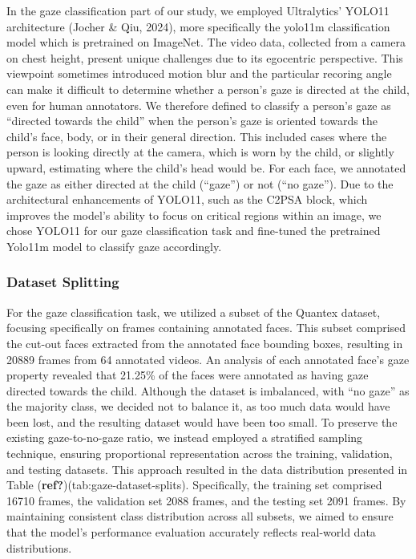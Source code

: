 \documentclass[
  man,floatsintext]{apa6}
\begin{document}
In the gaze classification part of our study, we employed Ultralytics' YOLO11 architecture (Jocher \& Qiu, 2024), more specifically the yolo11m classification model which is pretrained on ImageNet. The video data, collected from a camera on chest height, present unique challenges due to its egocentric perspective. This viewpoint sometimes introduced motion blur and the particular recoring angle can make it difficult to determine whether a person's gaze is directed at the child, even for human annotators. We therefore defined to classify a person's gaze as ``directed towards the child'' when the person's gaze is oriented towards the child's face, body, or in their general direction. This included cases where the person is looking directly at the camera, which is worn by the child, or slightly upward, estimating where the child's head would be. For each face, we annotated the gaze as either directed at the child (``gaze'') or not (``no gaze''). Due to the architectural enhancements of YOLO11, such as the C2PSA block, which improves the model's ability to focus on critical regions within an image, we chose YOLO11 for our gaze classification task and fine-tuned the pretrained Yolo11m model to classify gaze accordingly.

\subsubsection{Dataset Splitting}\label{dataset-splitting-1}

For the gaze classification task, we utilized a subset of the Quantex dataset, focusing specifically on frames containing annotated faces. This subset comprised the cut-out faces extracted from the annotated face bounding boxes, resulting in 20889 frames from 64 annotated videos. An analysis of each annotated face's gaze property revealed that 21.25\% of the faces were annotated as having gaze directed towards the child. Although the dataset is imbalanced, with ``no gaze'' as the majority class, we decided not to balance it, as too much data would have been lost, and the resulting dataset would have been too small. To preserve the existing gaze-to-no-gaze ratio, we instead employed a stratified sampling technique, ensuring proportional representation across the training, validation, and testing datasets. This approach resulted in the data distribution presented in Table (\textbf{ref?})(tab:gaze-dataset-splits). Specifically, the training set comprised 16710 frames, the validation set 2088 frames, and the testing set 2091 frames. By maintaining consistent class distribution across all subsets, we aimed to ensure that the model's performance evaluation accurately reflects real-world data distributions.
\end{document}

